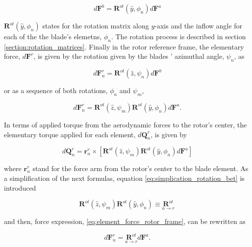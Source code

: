 \begin{equation}
    d\mathbf{F}^b = \boldsymbol{R}^{ot}(\hat{y}, \phi_n) d\mathbf{F}^a
    \label{eq:aero_to_blade_force}
\end{equation}

$\boldsymbol{R}^{ot}(\hat{y}, \phi_n)$ states for the rotation matrix along $y$-axis and the inflow angle for each of the the blade's elemetns, $\phi_n$. The rotation process is described in section \ref{section:rotation_matrices}. Finally in the rotor reference frame, the elementary force, $d\mathbf{F}^r$, is given by the rotation given by the blades ' azimuthal angle, $\psi_n$, as

\begin{equation}
    d\mathbf{F}^r_n = \boldsymbol{R}^{ot}(\hat{z}, \psi_n) d\mathbf{F}^b
\end{equation}

or as a sequence of both rotations, $\phi_n$ and $\psi_m$,

\begin{equation}
    d\mathbf{F}^r_n = \boldsymbol{R}^{ot}(\hat{z}, \psi_m) \boldsymbol{R}^{ot}(\hat{y}, \phi_n) d\mathbf{F}^a.
    \label{eq:element_force_rotor_frame}
\end{equation}

In terms of applied torque from the aerodynamic forces to the rotor's center, the elementary torque applied for each element, $d\mathbf{Q}^r_n$, is given by 

\begin{equation}
    d\mathbf{Q}^r_n = \mathbf{r}^r_n \times \left[ \boldsymbol{R}^{ot}(\hat{z}, \psi_m) \boldsymbol{R}^{ot}(\hat{y}, \phi_n) d\mathbf{F}^a \right] 
    \label{eq:element_torque_rotor_frame}
\end{equation}

where $\mathbf{r}^r_n$ stand for the force arm from the rotor's center to the blade element. As a simplification of the next formulas, equation  \ref{eq:simplication_rotation_bet} is introduced

\begin{equation}
    \boldsymbol{R}^{ot}(\hat{z}, \psi_m) \boldsymbol{R}^{ot}(\hat{y}, \phi_n) \equiv \underset{a \to r}{\boldsymbol{R}^{ot}}\
    \label{eq:simplication_rotation_bet}
\end{equation}

and then, force expression, \ref{eq:element_force_rotor_frame}, can be rewritten as

\begin{equation}
    d\mathbf{F}^r_n = \underset{a \to r}{\boldsymbol{R}^{ot}} d\mathbf{F}^a.
    \label{eq:element_force_rotor_frame_simplified}
\end{equation}


